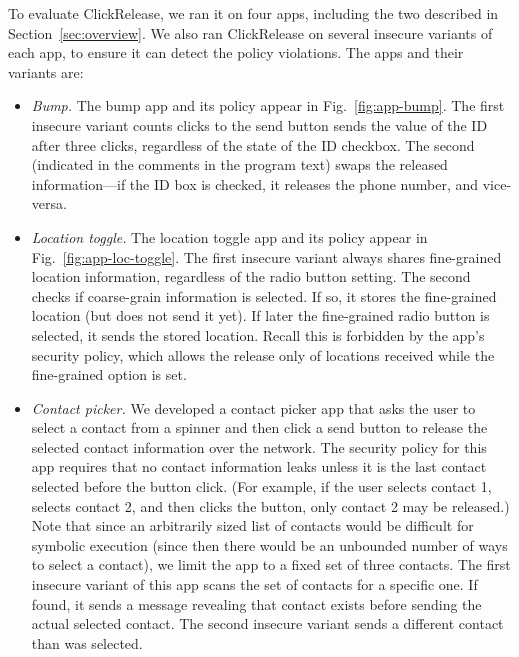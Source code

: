 \documentclass{llncs}
\newcommand{\toolname}{ClickRelease\xspace}
\begin{document}
To evaluate \toolname{}, we ran it on four apps, including the two
described in Section~\ref{sec:overview}. We also ran \toolname{} on
several insecure variants of each app, to ensure it can detect the
policy violations. The apps and their variants
are:

\begin{itemize}[leftmargin=*]
\item \textit{Bump.} The bump app and its policy appear in
  Fig.~\ref{fig:app-bump}. The first insecure variant counts clicks to
  the send button sends the value of the
  ID after three clicks, regardless of the state of the ID
  checkbox. The second (indicated in the comments in the program text)
  swaps the released information---if the ID
  box is checked, it releases the phone number, and vice-versa.

\item \textit{Location toggle.} The location toggle app and
  its policy appear in Fig.~\ref{fig:app-loc-toggle}. The first insecure
  variant always shares fine-grained location information, regardless
  of the radio button setting. The second checks if coarse-grain
  information is selected. If so, it stores the fine-grained location
  (but does not send it yet).  If later the fine-grained radio button
  is selected, it sends the stored location. Recall this is forbidden
  by the app's security policy, which allows the release only of locations
  received while the fine-grained option is set.

\item \textit{Contact picker.} We developed a contact picker app
  that asks the user to select a contact from a spinner and then
  click a send button to release the selected contact information over the
  network. The security policy for this app requires that no contact
  information leaks unless it is the last contact selected before the
  button click. (For example, if the user selects contact 1,
  selects contact 2, and then clicks the button, only contact 2 may be
  released.) Note that since an arbitrarily sized list of contacts
  would be difficult for symbolic execution (since then there would be
  an unbounded number of ways to select a contact), we limit the app
  to a fixed set of three contacts.
  The first insecure variant of this app scans the set of contacts for a
  specific one. If found, it sends a message revealing that contact
  exists before sending the actual selected contact. The second insecure
  variant sends a different contact than was selected.



\end{itemize}
\end{document}
